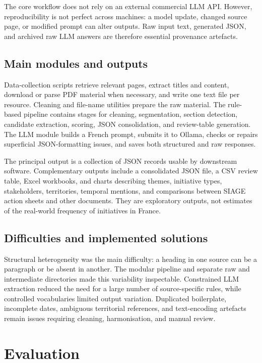 The core workflow does not rely on an external commercial LLM API. However,
reproducibility is not perfect across machines: a model update, changed source
page, or modified prompt can alter outputs. Raw input text, generated JSON, and
archived raw LLM answers are therefore essential provenance artefacts.

\section{Main modules and outputs}

Data-collection scripts retrieve relevant pages, extract titles and content,
download or parse PDF material when necessary, and write one text file per
resource. Cleaning and file-name utilities prepare the raw material. The
rule-based pipeline contains stages for cleaning, segmentation, section
detection, candidate extraction, scoring, JSON consolidation, and review-table
generation. The LLM module builds a French prompt, submits it to Ollama, checks
or repairs superficial JSON-formatting issues, and saves both structured and raw
responses.

The principal output is a collection of JSON records usable by downstream
software. Complementary outputs include a consolidated JSON file, a CSV review
table, Excel workbooks, and charts describing themes, initiative types,
stakeholders, territories, temporal mentions, and comparisons between SIAGE
action sheets and other documents. They are exploratory outputs, not estimates
of the real-world frequency of initiatives in France.

\section{Difficulties and implemented solutions}

Structural heterogeneity was the main difficulty: a heading in one source can
be a paragraph or be absent in another. The modular pipeline and separate raw
and intermediate directories made this variability inspectable. Constrained LLM
extraction reduced the need for a large number of source-specific rules, while
controlled vocabularies limited output variation. Duplicated boilerplate,
incomplete dates, ambiguous territorial references, and text-encoding artefacts
remain issues requiring cleaning, harmonisation, and manual review.

\chapter{Evaluation}

